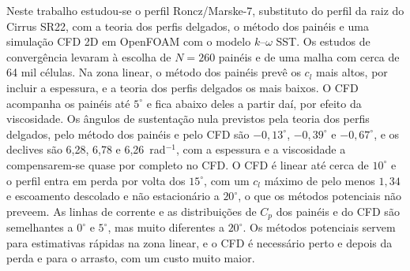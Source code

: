 \tituloResumo

Neste trabalho estudou-se o perfil Roncz/Marske-7, substituto do perfil da
raiz do Cirrus SR22, com a teoria dos perfis delgados, o método
dos painéis e uma simulação CFD 2D em OpenFOAM com o modelo
$k$--$\omega$ SST. Os estudos de convergência levaram à escolha de $N = 260$
painéis e de uma malha com cerca de 64 mil células. Na zona linear, o método dos
painéis prevê os $c_l$ mais altos, por incluir a espessura, e a teoria dos
perfis delgados os mais baixos. O CFD acompanha os painéis até $5^\circ$ e fica
abaixo deles a partir daí, por efeito da viscosidade. Os ângulos de sustentação
nula previstos pela teoria dos perfis delgados, pelo método dos painéis e pelo
CFD são $-0{,}13^\circ$, $-0{,}39^\circ$ e $-0{,}67^\circ$, e os declives são
6,28, 6,78 e 6,26~rad$^{-1}$, com a espessura e a viscosidade a compensarem-se
quase por completo no CFD. O CFD é linear até cerca de $10^\circ$ e o perfil
entra em perda por volta dos $15^\circ$, com um $c_l$ máximo de pelo menos
$1{,}34$ e escoamento descolado e não estacionário a $20^\circ$, o que os
métodos potenciais não preveem. As linhas de
corrente e as distribuições de $C_p$ dos painéis e do CFD são semelhantes a
$0^\circ$ e $5^\circ$, mas muito diferentes a $20^\circ$. Os métodos potenciais
servem para estimativas rápidas na zona linear, e o CFD é necessário perto e
depois da perda e para o arrasto, com um custo muito maior.
